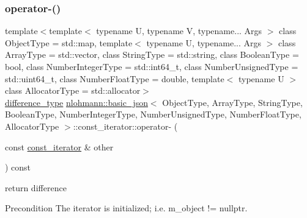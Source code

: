 \subsubsection{\texorpdfstring{operator-\/()}{operator-()}\hspace{0.1cm}{\footnotesize\ttfamily [2/2]}}
{\footnotesize\ttfamily template$<$template$<$ typename U, typename V, typename... Args $>$ class Object\+Type = std\+::map, template$<$ typename U, typename... Args $>$ class Array\+Type = std\+::vector, class String\+Type  = std\+::string, class Boolean\+Type  = bool, class Number\+Integer\+Type  = std\+::int64\+\_\+t, class Number\+Unsigned\+Type  = std\+::uint64\+\_\+t, class Number\+Float\+Type  = double, template$<$ typename U $>$ class Allocator\+Type = std\+::allocator$>$ \\
\hyperlink{classnlohmann_1_1basic__json_1_1const__iterator_a49d7c3e9ef3280df03052cce988b792f}{difference\+\_\+type} \hyperlink{classnlohmann_1_1basic__json}{nlohmann\+::basic\+\_\+json}$<$ Object\+Type, Array\+Type, String\+Type, Boolean\+Type, Number\+Integer\+Type, Number\+Unsigned\+Type, Number\+Float\+Type, Allocator\+Type $>$\+::const\+\_\+iterator\+::operator-\/ (\begin{DoxyParamCaption}\item[{const \hyperlink{classnlohmann_1_1basic__json_1_1const__iterator}{const\+\_\+iterator} \&}]{other }\end{DoxyParamCaption}) const\hspace{0.3cm}{\ttfamily [inline]}}



return difference 

\begin{DoxyPrecond}{Precondition}
The iterator is initialized; i.\+e. {\ttfamily m\+\_\+object != nullptr}. 
\end{DoxyPrecond}
\mbox{\label{classnlohmann_1_1basic__json_1_1const__iterator_a6cab1c2ed7e2a014980e2a5717f43a64}} 
